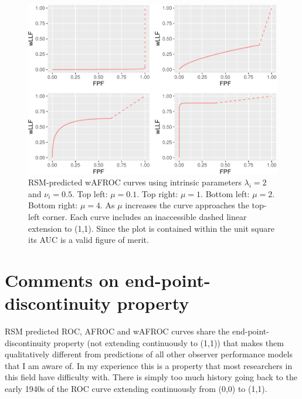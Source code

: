 \documentclass[
]{book}
\begin{document}
\begin{figure}
\centering
\includegraphics{08-rsm-predictions2_files/figure-latex/rsm-other-predictions-wafroc-plots-lambdai-nui-1.pdf}
\caption{\label{fig:rsm-other-predictions-wafroc-plots-lambdai-nui}RSM-predicted wAFROC curves using intrinsic parameters \(\lambda_i = 2\) and \(\nu_i = 0.5\). Top left: \(\mu = 0.1\). Top right: \(\mu = 1\). Bottom left: \(\mu = 2\). Bottom right: \(\mu = 4\). As \(\mu\) increases the curve approaches the top-left corner. Each curve includes an inaccessible dashed linear extension to (1,1). Since the plot is contained within the unit square its AUC is a valid figure of merit.}
\end{figure}

\hypertarget{rsm-other-predictions-comments}{%
\section{Comments on end-point-discontinuity property}\label{rsm-other-predictions-comments}}

RSM predicted ROC, AFROC and wAFROC curves share the end-point-discontinuity property (not extending continuously to (1,1)) that makes them qualitatively different from predictions of all other observer performance models that I am aware of. In my experience this is a property that most researchers in this field have difficulty with. There is simply too much history going back to the early 1940s of the ROC curve extending continuously from (0,0) to (1,1).
\end{document}
